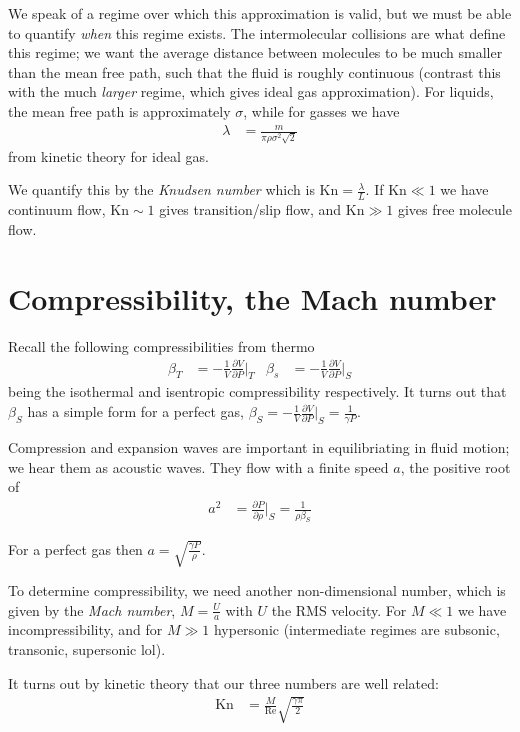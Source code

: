 \documentclass[10pt]{report}
\newcommand{\pd}[2]{\frac{\partial #1}{\partial#2}}
\begin{document}
We speak of a regime over which this approximation is valid, but we must be able to quantify \emph{when} this regime exists. The intermolecular collisions are what define this regime; we want the average distance between molecules to be much smaller than the mean free path, such that the fluid is roughly continuous (contrast this with the much \emph{larger} regime, which gives ideal gas approximation). For liquids, the mean free path is approximately $\sigma$, while for gasses we have
\begin{align}
    \lambda &= \frac{m}{\pi \rho \sigma^2 \sqrt{2}}
\end{align}
from kinetic theory for ideal gas.

We quantify this by the \emph{Knudsen number} which is $\mathrm{Kn} = \frac{\lambda}{L}$. If $\mathrm{Kn} \ll 1$ we have continuum flow, $\mathrm{Kn} \sim 1$ gives transition/slip flow, and $\mathrm{Kn} \gg 1$ gives free molecule flow.

\section{Compressibility, the Mach number}

Recall the following compressibilities from thermo
\begin{align}
    \beta_T &= -\frac{1}{V} \pd{V}{P}\Bigg|_T & \beta_s &= -\frac{1}{V} \pd{V}{P}\Bigg|_S
\end{align}
being the isothermal and isentropic compressibility respectively. It turns out that $\beta_S$ has a simple form for a perfect gas, $\beta_S = -\frac{1}{V}\pd{V}{P}\Bigg|_S = \frac{1}{\gamma P}$. 

Compression and expansion waves are important in equilibriating in fluid motion; we hear them as acoustic waves. They flow with a finite speed $a$, the positive root of 
\begin{align}
    a^2 &= \pd{P}{\rho}\Bigg|_S = \frac{1}{\rho \beta_S}
\end{align}

For a perfect gas then $a = \sqrt{\frac{\gamma P}{\rho}}$. 

To determine compressibility, we need another non-dimensional number, which is given by the \emph{Mach number}, $M = \frac{U}{a}$ with $U$ the RMS velocity. For $M \ll 1$ we have incompressibility, and for $M \gg 1$ hypersonic (intermediate regimes are subsonic, transonic, supersonic lol). 

It turns out by kinetic theory that our three numbers are well related:
\begin{align}
    \mathrm{Kn} &= \frac{M}{\mathrm{Re}}\sqrt{\frac{\gamma\pi}{2}}
\end{align}
\end{document}
